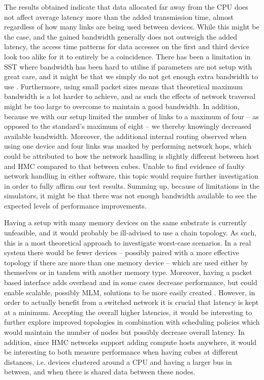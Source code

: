 The results obtained indicate that data allocated far away from the CPU does not affect average latency more than the added transmission time, almost regardless of how many links are being used between devices. While this might be the case, and the gained bandwidth generally does not outweigh the added latency, the access time patterns for data accesses on the first and third device look too alike for it to entirely be a coincidence. There has been a limitation in SST where bandwidth has been hard to utilise if parameters are not setup with great care, and it might be that we simply do not get enough extra bandwidth to use \cite{hammond_rodrigues_hemmert}. Furthermore, using small packet sizes means that theoretical maximum bandwidth is a lot harder to achieve, and as such the effects of network traversal might be too large to overcome to maintain a good bandwidth. In addition, because we with our setup limited the number of links to a maximum of four -- as opposed to the standard's maximum of eight -- we thereby knowingly decreased available bandwidth. Moreover, the additional internal routing observed when using one device and four links was masked by performing network hops, which could be attributed to how the network handling is slightly different between host and HMC compared to that between cubes. Unable to find evidence of faulty network handling in either software, this topic would require further investigation in order to fully affirm our test results. Summing up, because of limitations in the simulators, it might be that there was not enough bandwidth available to see the expected levels of performance improvements. 
\bigskip

Having a setup with many memory devices on the same substrate is currently unfeasible, and it would probably be ill-advised to use a chain topology. As such, this is a most theoretical approach to investigate worst-case scenarios. In a real system there would be fewer devices -- possibly paired with a more effective topology if there are more than one memory device -- which are used either by themselves or in tandem with another memory type. Moreover, having a packet based interface adds overhead and in some cases decrease performance, but could enable scalable, possibly MLM, solutions to be more easily created \cite{8167757}. However, in order to actually benefit from a switched network it is crucial that latency is kept at a minimum. Accepting the overall higher latencies, it would be interesting to further explore improved topologies in combination with scheduling policies which would maintain the number of nodes but possibly decrease overall latency. In addition, since HMC networks support adding compute hosts anywhere, it would be interesting to both measure performance when having cubes at different distances, i.e. devices clustered around a CPU and having a larger bus in between, and when there is shared data between these nodes.
\bigskip


